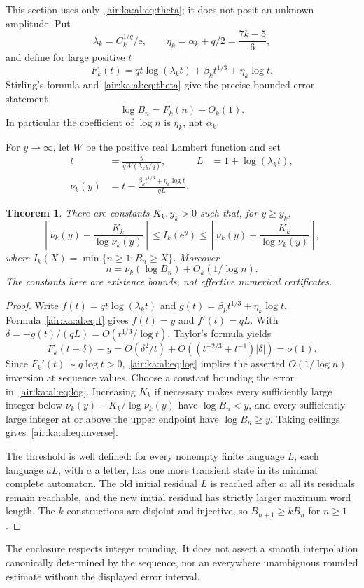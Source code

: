 \documentclass[11pt,letterpaper]{article}
\numberwithin{equation}{section}
\newtheorem{theorem}{Theorem}[section]
\theoremstyle{remark}
\newcommand{\ee}{\mathrm e}
\begin{document}
This section uses only~\eqref{air:ka:al:eq:theta}; it does not posit an unknown amplitude.
Put
\[
\lambda_k=C_k^{1/q}/\ee,\qquad
\eta_k=\alpha_k+q/2=\frac{7k-5}{6},
\]
and define for large positive $t$
\begin{equation}\label{air:ka:al:eq:F}
F_k(t)=q t\log(\lambda_kt)+\beta_kt^{1/3}+\eta_k\log t.
\end{equation}
Stirling's formula and~\eqref{air:ka:al:eq:theta} give the precise bounded-error statement
\begin{equation}\label{air:ka:al:eq:log}
\log B_n=F_k(n)+O_k(1).
\end{equation}
In particular the coefficient of $\log n$ is $\eta_k$, not $\alpha_k$.

For $y\to\infty$, let $W$ be the positive real Lambert function and set
\begin{align}
t&=\frac{y}{qW(\lambda_ky/q)},&
L&=1+\log(\lambda_kt),\label{air:ka:al:eq:t}\\
\nu_k(y)&=t-\frac{\beta_kt^{1/3}+\eta_k\log t}{qL}.\label{air:ka:al:eq:nu}
\end{align}
\begin{theorem}\label{air:ka:al:thm:inverse}
There are constants $K_k,y_k>0$ such that, for $y\ge y_k$,
\begin{equation}\label{air:ka:al:eq:inverse}
\left\lceil\nu_k(y)-\frac{K_k}{\log\nu_k(y)}\right\rceil
\le I_k(\ee^y)\le
\left\lceil\nu_k(y)+\frac{K_k}{\log\nu_k(y)}\right\rceil,
\end{equation}
where $I_k(X)=\min\{n\ge1:B_n\ge X\}$. Moreover
\[
n=\nu_k(\log B_n)+O_k(1/\log n).
\]
The constants here are existence bounds, not effective numerical certificates.
\end{theorem}
\begin{proof}
Write $f(t)=qt\log(\lambda_kt)$ and
$g(t)=\beta_kt^{1/3}+\eta_k\log t$. Formula~\eqref{air:ka:al:eq:t} gives $f(t)=y$
and $f'(t)=qL$. With $\delta=-g(t)/(qL)=O(t^{1/3}/\log t)$,
Taylor's formula yields
\[
F_k(t+\delta)-y
=O(\delta^2/t)+O((t^{-2/3}+t^{-1})|\delta|)=o(1).
\]
Since $F_k'(t)\sim q\log t>0$,~\eqref{air:ka:al:eq:log} implies the asserted
$O(1/\log n)$ inversion at sequence values.
Choose a constant bounding the error in~\eqref{air:ka:al:eq:log}. Increasing $K_k$
if necessary makes every sufficiently large integer below
$\nu_k(y)-K_k/\log\nu_k(y)$ have $\log B_n<y$, and every sufficiently
large integer at or above the upper endpoint have $\log B_n\ge y$.
Taking ceilings gives~\eqref{air:ka:al:eq:inverse}.

The threshold is well defined: for every nonempty finite language $L$, each
language $aL$, with $a$ a letter, has one more transient state in its minimal
complete automaton. The old initial residual $L$ is reached after $a$;
all its residuals remain reachable, and the new initial residual has strictly
larger maximum word length. The $k$ constructions are disjoint and injective,
so $B_{n+1}\ge kB_n$ for $n\ge1$.
\end{proof}
The enclosure respects integer rounding. It does not assert a smooth
interpolation canonically determined by the sequence, nor an everywhere
unambiguous rounded estimate without the displayed error interval.
\end{document}

